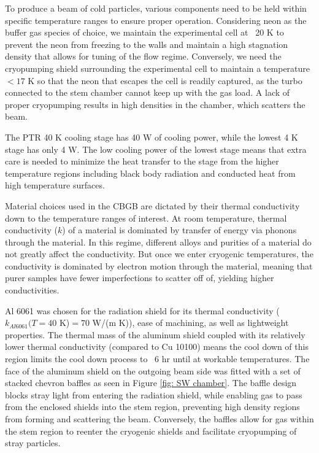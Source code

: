 To produce a beam of cold particles, various components need to be held within specific temperature ranges to ensure proper operation. Considering neon as the buffer gas species of choice, we maintain the experimental cell at ~20 K to prevent the neon from freezing to the walls and maintain a high stagnation density that allows for tuning of the flow regime. Conversely, we need the cryopumping shield surrounding the experimental cell to maintain a temperature $<17$ K so that the neon that escapes the cell is readily captured, as the turbo connected to the stem chamber cannot keep up with the gas load. A lack of proper cryopumping results in high densities in the chamber, which scatters the beam.

The PTR 40 K cooling stage has 40 W of cooling power, while the lowest 4 K stage has only 4 W. The low cooling power of the lowest stage means that extra care is needed to minimize the heat transfer to the stage from the higher temperature regions including black body radiation and conducted heat from high temperature surfaces.

Material choices used in the CBGB are dictated by their thermal conductivity down to the temperature ranges of interest. At room temperature, thermal conductivity ($k$) of a material is dominated by transfer of energy via phonons through the material. In this regime, different alloys and purities of a material do not greatly affect the conductivity. But once we enter cryogenic temperatures, the conductivity is dominated by electron motion through the material, meaning that purer samples have fewer imperfections to scatter off of, yielding higher conductivities.

Al 6061 was chosen for the radiation shield for its thermal conductivity ($k_{Al6061}(T=40$ K)$ = 70$ W/(m K)\cite{Bradley}), ease of machining, as well as lightweight properties. The thermal mass of the aluminum shield coupled with its relatively lower thermal conductivity (compared to Cu 10100) means the cool down of this region limits the cool down process to ~6 hr until at workable temperatures. The face of the aluminum shield on the outgoing beam side was fitted with a set of stacked chevron baffles as seen in Figure \ref{fig: SW chamber}. The baffle design blocks stray light from entering the radiation shield, while enabling gas to pass from the enclosed shields into the stem region, preventing high density regions from forming and scattering the beam. Conversely, the baffles allow for gas within the stem region to reenter the cryogenic shields and facilitate cryopumping of stray particles.

